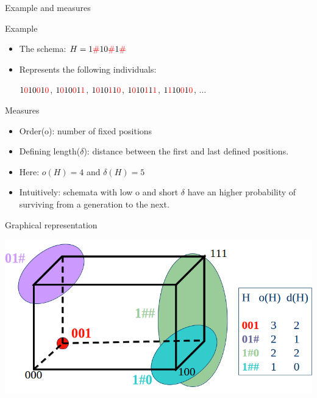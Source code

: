 \begin{frame}{Example and measures}
  \begin{block}{Example}
    \begin{itemize}
    \item The schema: $H = 1\textcolor{red}{\#}10\textcolor{red}{\#}1\textcolor{red}{\#}$
    \item Represents the following individuals:
      \begin{center}
        $1\textcolor{red}{0}10\textcolor{red}{0}1\textcolor{red}{0}$,
        $1\textcolor{red}{0}10\textcolor{red}{0}1\textcolor{red}{1}$,
        $1\textcolor{red}{0}10\textcolor{red}{1}1\textcolor{red}{0}$,
        $1\textcolor{red}{0}10\textcolor{red}{1}1\textcolor{red}{1}$,
        $1\textcolor{red}{1}10\textcolor{red}{0}1\textcolor{red}{0}$,
        $\ldots$
      \end{center}
    \end{itemize}
  \end{block}

  \begin{block}{Measures}
    \begin{itemize}
      \item Order(o): number of fixed positions
      \item Defining length($\delta$): distance between the first and last defined positions.
      \item Here: $o(H) = 4$ and $\delta(H) = 5$
      \item Intuitively: schemata with low o and short $\delta$ have an higher probability of surviving from a generation to the next.
    \end{itemize}
  \end{block}
\end{frame}

\begin{frame}{Graphical representation}
  \begin{center}
    \includegraphics[scale=.4]{img/schema}
  \end{center}
\end{frame}

